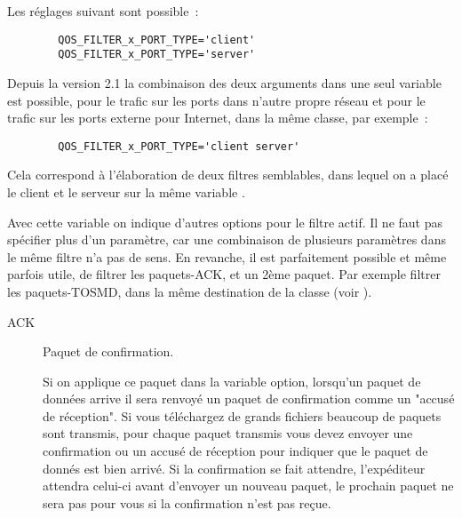 \begin{description}
    Les réglages suivant sont possible~:

\begin{example}
\begin{verbatim}
        QOS_FILTER_x_PORT_TYPE='client'
        QOS_FILTER_x_PORT_TYPE='server'
\end{verbatim}
\end{example}

    Depuis la version 2.1 la combinaison des deux arguments dans une seul
    variable est possible, pour le trafic sur les ports dans n'autre
    propre réseau et pour le trafic sur les ports externe pour Internet, dans
    la même classe, par exemple~:

\begin{example}
\begin{verbatim}
        QOS_FILTER_x_PORT_TYPE='client server'
\end{verbatim}
\end{example}

    Cela correspond à l'élaboration de deux filtres semblables, dans lequel on
    a placé le client et le serveur sur la même variable .


    Avec cette variable on indique d'autres options pour le filtre actif.
    Il ne faut pas spécifier plus d'un paramètre, car une combinaison de
    plusieurs paramètres dans le même filtre n'a pas de sens. En revanche,
    il est parfaitement possible et même parfois utile, de filtrer les
    paquets-ACK, et un 2ème paquet. Par exemple filtrer les paquets-TOSMD,
    dans la même destination de la classe (voir ).

    \begin{description}
  \item[ACK] Paquet de confirmation.

    Si on applique ce paquet dans la variable option, lorsqu'un paquet de données
    arrive il sera renvoyé un paquet de confirmation comme un "accusé de
    réception". Si vous téléchargez de grands fichiers beaucoup de paquets
    sont transmis, pour chaque paquet transmis vous devez envoyer une
    confirmation ou un accusé de réception pour indiquer que le paquet
    de donnés est bien arrivé. Si la confirmation se fait attendre,
    l'expéditeur attendra celui-ci avant d'envoyer un nouveau paquet,
    le prochain paquet ne sera pas pour vous si la confirmation n'est pas reçue.


\end{description}
\end{description}
